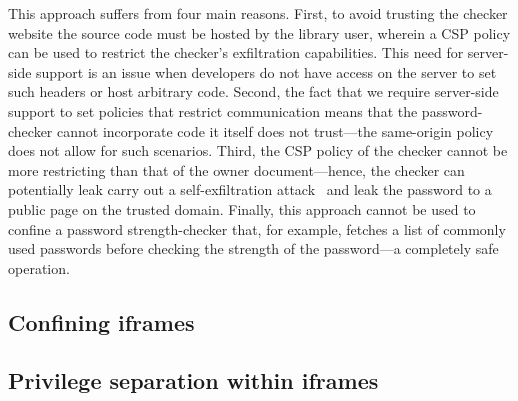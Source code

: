 This approach suffers from four main reasons.
%
First, to avoid trusting the checker website the source code must be
hosted by the library user, wherein a CSP policy can be used to
restrict the checker's exfiltration capabilities. 
%
This need for server-side support is an issue when developers do not
have access on the server to set such headers or host arbitrary code.
%
Second, the fact that we require server-side support to set policies
that restrict communication means that the password-checker cannot
incorporate code it itself does not trust---the same-origin policy
does not allow for such scenarios.
%
Third, the CSP policy of the checker cannot be more restricting than
that of the owner document---hence, the checker can potentially leak
carry out a self-exfiltration attack~ and
leak the password to a public page on the trusted domain.
%
Finally, this approach cannot be used to confine a password
strength-checker that, for example, fetches a list of commonly used
passwords before checking the strength of the password---a completely
safe operation.



\subsection{Confining iframes}
\label{sec:system:iframe}

\subsection{Privilege separation within iframes}
\label{sec:system:script}
